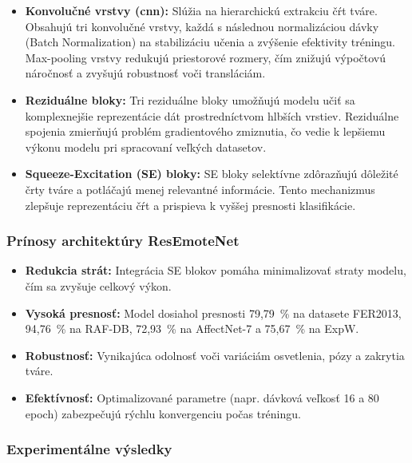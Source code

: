 \begin{itemize}
    \item \textbf{Konvolučné vrstvy (\gls{cnn}):} 
    Slúžia na hierarchickú extrakciu čŕt tváre. Obsahujú tri konvolučné vrstvy, každá s následnou normalizáciou dávky (Batch Normalization) na stabilizáciu učenia a zvýšenie efektivity tréningu. Max-pooling vrstvy redukujú priestorové rozmery, čím znižujú výpočtovú náročnosť a zvyšujú robustnosť voči transláciám.
    
    \item \textbf{Reziduálne bloky:} 
    Tri reziduálne bloky umožňujú modelu učiť sa komplexnejšie reprezentácie dát prostredníctvom hlbších vrstiev. Reziduálne spojenia zmierňujú problém gradientového zmiznutia, čo vedie k lepšiemu výkonu modelu pri spracovaní veľkých datasetov.
    
    \item \textbf{Squeeze-Excitation (SE) bloky:} 
    SE bloky selektívne zdôrazňujú dôležité črty tváre a potláčajú menej relevantné informácie. Tento mechanizmus zlepšuje reprezentáciu čŕt a prispieva k vyššej presnosti klasifikácie.
\end{itemize}

\subsubsection{Prínosy architektúry ResEmoteNet}

\begin{itemize}
    \item \textbf{Redukcia strát:} Integrácia SE blokov pomáha minimalizovať straty modelu, čím sa zvyšuje celkový výkon.
    \item \textbf{Vysoká presnosť:} Model dosiahol presnosti 79,79~\% na datasete FER2013, 94,76~\% na RAF-DB, 72,93~\% na AffectNet-7 a 75,67~\% na ExpW.
    \item \textbf{Robustnosť:} Vynikajúca odolnosť voči variáciám osvetlenia, pózy a zakrytia tváre.
    \item \textbf{Efektívnosť:} Optimalizované parametre (napr. dávková veľkosť 16 a 80 epoch) zabezpečujú rýchlu konvergenciu počas tréningu.
\end{itemize}

\subsubsection{Experimentálne výsledky}

